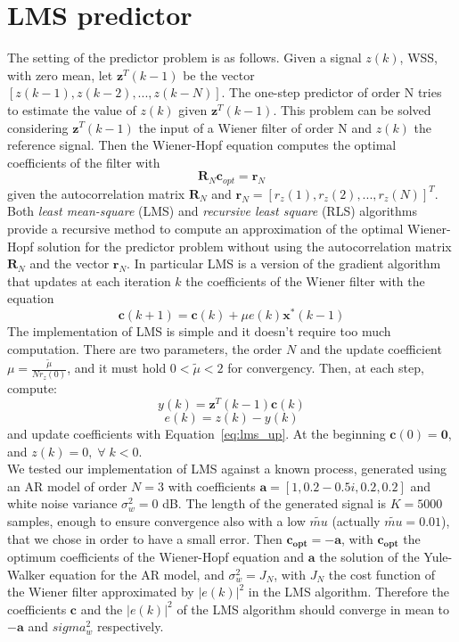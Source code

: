 \documentclass[10pt]{article}
\numberwithin{equation}{section}
\begin{document}
\section{LMS predictor}
\label{sec:lms}
The setting of the predictor problem is as follows. Given a signal $z(k)$, WSS, with zero mean, let $\mathbf{z}^T(k-1)$ be the vector $[z(k-1), z(k-2), ..., z(k-N)]$. The one-step predictor of order N tries to estimate the value of $z(k)$ given $\mathbf{z}^T(k-1)$. This problem can be solved considering $\mathbf{z}^T(k-1)$ the input of a Wiener filter of order N and $z(k)$ the reference signal. Then the Wiener-Hopf equation computes the optimal coefficients of the filter with
\begin{equation}
  \mathbf{R}_N \mathbf{c}_{opt} = \mathbf{r}_N
  \label{eq:wh}
\end{equation}
given the autocorrelation matrix $\mathbf{R}_N$ and $\mathbf{r}_N = [r_z(1), r_z(2), ..., r_z(N)]^T$. \\
Both \textit{least mean-square} (LMS) and \textit{recursive least square} (RLS) algorithms provide a recursive method to compute an approximation of the optimal Wiener-Hopf solution for the predictor problem without using the autocorrelation matrix $\mathbf{R}_N$ and the vector $\mathbf{r}_N$.
In particular LMS is a version of the gradient algorithm that updates at each iteration $k$ the coefficients of the Wiener filter with the equation
\begin{equation}
  \mathbf{c}(k+1) = \mathbf{c}(k) + \mu e(k) \mathbf{x}^*(k-1)
  \label{eq:lms_up}
\end{equation}
The implementation of LMS is simple and it doesn't require too much computation. There are two parameters, the order $N$ and the update coefficient $\mu = \frac{\tilde{\mu}}{N r_z(0)}$, and it must hold $0 < \tilde{\mu} < 2$ for convergency. Then, at each step, compute:
\begin{equation}
  y(k) = \mathbf{z}^T(k-1) \mathbf{c}(k)
\end{equation}
\begin{equation}
  e(k) = z(k) - y(k)
\end{equation}
and update coefficients with Equation~\ref{eq:lms_up}. At the beginning $\mathbf{c}(0) = \mathbf{0}$, and $z(k) = 0, \; \forall \; k < 0$. \\
We tested our implementation of LMS against a known process, generated using an AR model of order $N = 3$ with coefficients $\mathbf{a} = [1, 0.2-0.5i, 0.2, 0.2]$ and white noise variance $\sigma_w^2 = 0$ dB. The length of the generated signal is $K = 5000$ samples, enough to ensure convergence also with a low $\tilde{mu}$ (actually $\tilde{mu} = 0.01$), that we chose in order to have a small error. Then $\mathbf{c_{opt}} = -\mathbf{a}$, with $\mathbf{c_{opt}}$ the optimum coefficients  of the Wiener-Hopf equation and $\mathbf{a}$ the solution of the Yule-Walker equation for the AR model, and $\sigma_w^2 = J_N$, with $J_N$ the cost function of the Wiener filter approximated by $|e(k)|^2$ in the LMS algorithm. Therefore the coefficients $\mathbf{c}$ and the $|e(k)|^2$ of the LMS algorithm should converge in mean to $-\mathbf{a}$ and $sigma_w^2$ respectively.
\end{document}
